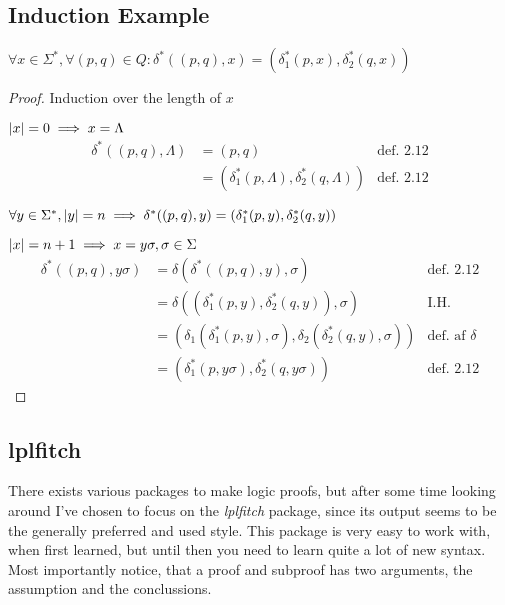 \documentclass[a4, english, twoside]{article}
\begin{document}
\subsection{Induction Example}
\begin{lemma}[Martin 2.11]
	$\forall x \in \Sigma^* , \forall (p,q) \in Q: \delta^* ((p,q),x) = (\delta_1^* (p,x) , \delta_2^* (q,x))$
\end{lemma}
\begin{proof}
	\vspace{0.6em} \noindent
	Induction over the length of $x$

		$\left\lvert x \right\rvert = 0 \implies x = \Lambda$
		\begin{align*}
			\delta^*((p,q), \Lambda) &= (p,q)
							&\text{def. 2.12}
		\\
						 &= (\delta_1^* (p,\Lambda) , \delta_2^* (q,\Lambda))
						 	&\text{def. 2.12}
		\end{align*}

		$
			\forall y \in \Sigma^*, \left\lvert y \right\rvert = n
				\implies \delta^*((p,q), y) = (\delta_1^*(p,y), \delta_2^*(q,y))
		$
	
		$\left\lvert x \right\rvert = n+1 \implies x = y\sigma, \sigma \in \Sigma$
		\begin{align*}
			\delta^*((p,q),y\sigma) &= \delta(\delta^*((p,q),y),\sigma)
										&\text{def. 2.12}
		\\
							 		&= \delta((\delta_1^*(p,y), \delta_2^*(q,y)),\sigma)
							 			&\text{I.H.}
		\\
							 		&= (\delta_1(\delta_1^*(p,y),\sigma), \delta_2(\delta_2^*(q,y),\sigma))
							 			&\text{def. af } \delta
		\\
							 		&= (\delta_1^*(p,y\sigma), \delta_2^*(q,y\sigma))
							 			&\text{def. 2.12}
		\end{align*}
\end{proof}

\newpage
\subsection{lplfitch}
There exists various packages to make logic proofs, but after some time looking around I've chosen to focus on the \emph{lplfitch} package, since its output seems to be the generally preferred and used style. This package is very easy to work with, when first learned, but until then you need to learn quite a lot of new syntax. Most importantly notice, that a proof and subproof has two arguments, the assumption and the conclussions.
\begin{center}
\end{center}
\end{document}

